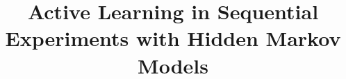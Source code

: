 \documentclass{article} %
\title{Active Learning in Sequential Experiments with Hidden Markov Models}
\author{
  
}
\begin{document}
\maketitle

\begin{abstract}
  
\end{abstract}





\end{document}
